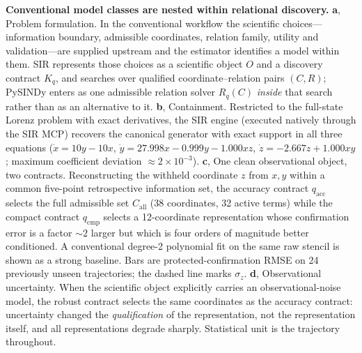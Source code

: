 
\caption{\textbf{Conventional model classes are nested within relational
discovery.}
\textbf{a}, Problem formulation. In the conventional workflow the scientific
choices---information boundary, admissible coordinates, relation family,
utility and validation---are supplied upstream and the estimator identifies a
model within them. SIR represents those choices as a scientific object $O$ and a
discovery contract $K_q$, and searches over qualified coordinate--relation pairs
$(C,R)$; PySINDy enters as one admissible relation solver $R_q(C)$ \emph{inside}
that search rather than as an alternative to it.
\textbf{b}, Containment. Restricted to the full-state Lorenz problem with exact
derivatives, the SIR engine (executed natively through the SIR MCP) recovers the
canonical generator with exact support in all three equations
($\dot x=10y-10x$, $\dot y=27.998x-0.999y-1.000xz$, $\dot z=-2.667z+1.000xy$;
maximum coefficient deviation $\approx 2\times10^{-3}$).
\textbf{c}, One clean observational object, two contracts. Reconstructing the
withheld coordinate $z$ from $x,y$ within a common five-point retrospective
information set, the accuracy contract $q_{\mathrm{acc}}$ selects the full
admissible set $C_{\mathrm{all}}$ (38 coordinates, 32 active terms) while the
compact contract $q_{\mathrm{cmp}}$ selects a 12-coordinate representation whose
confirmation error is a factor $\sim\!2$ larger but which is four orders of
magnitude better conditioned. A conventional degree-2 polynomial fit on the same
raw stencil is shown as a strong baseline. Bars are protected-confirmation RMSE
on 24 previously unseen trajectories; the dashed line marks $\sigma_z$.
\textbf{d}, Observational uncertainty. When the scientific object explicitly
carries an observational-noise model, the robust contract selects the same
coordinates as the accuracy contract: uncertainty changed the \emph{qualification}
of the representation, not the representation itself, and all representations
degrade sharply. Statistical unit is the trajectory throughout.}
